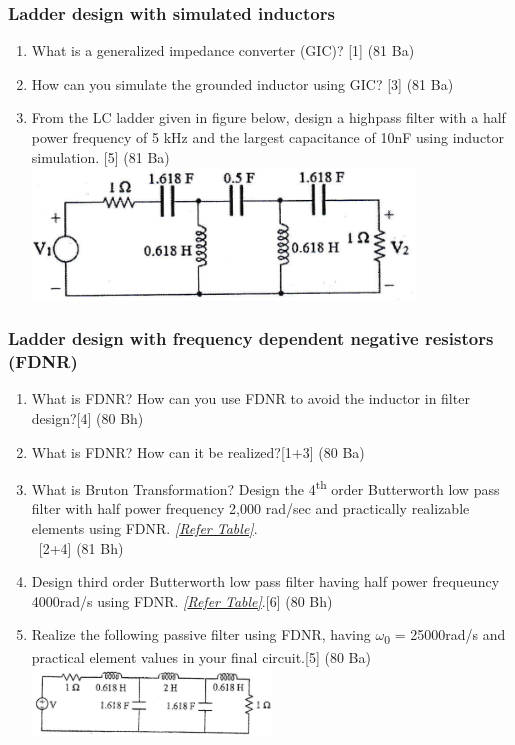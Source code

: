 \documentclass[12pt]{article}
\newcommand{\w}{\(\omega\)}
\newcommand{\enter}{\\\textcolor{white}{1}}
\newcommand{\sub}[1]{\textsubscript{#1}}
\begin{document}
\subsubsection{Ladder design with simulated inductors}
	\begin{enumerate}[noitemsep, topsep=0pt]
		\item What is a generalized impedance converter (GIC)? \hfill [1] (81 Ba)
		
		\item How can you simulate the grounded inductor using GIC? \hfill [3] (81 Ba)
		
		\item From the LC ladder given in figure below, design a highpass filter with a half power frequency of 5 kHz and the largest capacitance of 10nF using inductor simulation. \hfill [5] (81 Ba)\\
		\includegraphics[width=4in]{fd_11}
	\end{enumerate}
\subsubsection{Ladder design with frequency dependent negative resistors (FDNR)}
\begin{enumerate}
\item What is FDNR? How can you use FDNR to avoid the inductor in filter design?\hfill[4] (80 Bh)
\item What is FDNR? How can it be realized?\hfill [1+3] (80 Ba)
\item What is Bruton Transformation? Design the 4\textsuperscript{th} order Butterworth low pass filter with half power frequency 2,000 rad/sec and practically realizable elements using FDNR. \textit{[\hyperref[sec:tables_81bh]{Refer Table]}}.
\enter\hfill [2+4] (81 Bh)
\item Design third order Butterworth low pass filter having half power frequeuncy 4000rad/s using FDNR. \textit{[\hyperref[sec:tables_81bh]{Refer Table]}}.\hfill [6] (80 Bh)
\item Realize the following passive filter using FDNR, having \w\sub{0} = 25000rad/s and practical element values in your final circuit.\hfill[5] (80 Ba)\\
\includegraphics[width=0.5\textwidth]{fd_4}
\end{enumerate}
\end{document}
